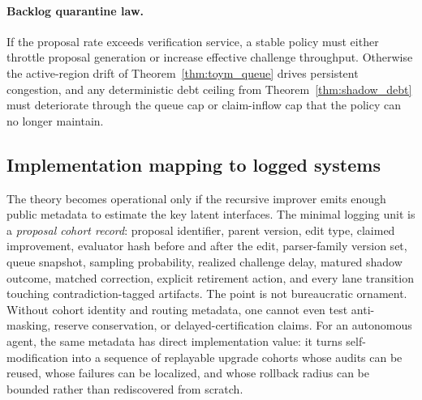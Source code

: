 \documentclass[11pt]{article}
\theoremstyle{definition}
\newcommand{\1}{\mathbf{1}}
\begin{document}
\paragraph{Backlog quarantine law.}
If the proposal rate exceeds verification service, a stable policy must either throttle proposal generation or increase effective challenge throughput. Otherwise the active-region drift of Theorem~\ref{thm:toym_queue} drives persistent congestion, and any deterministic debt ceiling from Theorem~\ref{thm:shadow_debt} must deteriorate through the queue cap or claim-inflow cap that the policy can no longer maintain.

\subsection{Implementation mapping to logged systems}
The theory becomes operational only if the recursive improver emits enough public metadata to estimate the key latent interfaces. The minimal logging unit is a \emph{proposal cohort record}: proposal identifier, parent version, edit type, claimed improvement, evaluator hash before and after the edit, parser-family version set, queue snapshot, sampling probability, realized challenge delay, matured shadow outcome, matched correction, explicit retirement action, and every lane transition touching contradiction-tagged artifacts. The point is not bureaucratic ornament. Without cohort identity and routing metadata, one cannot even test anti-masking, reserve conservation, or delayed-certification claims. For an autonomous agent, the same metadata has direct implementation value: it turns self-modification into a sequence of replayable upgrade cohorts whose audits can be reused, whose failures can be localized, and whose rollback radius can be bounded rather than rediscovered from scratch.
\end{document}
